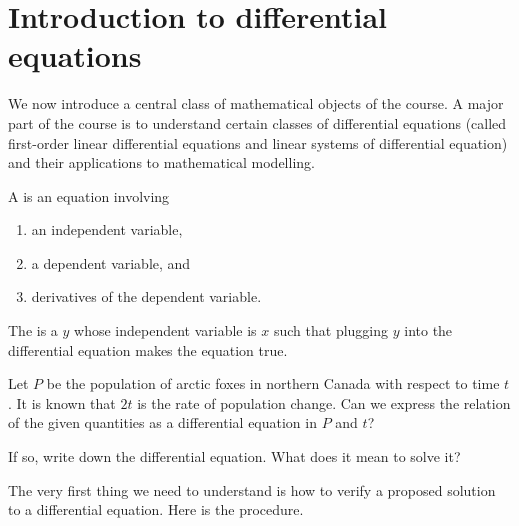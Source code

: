 \documentclass[../main.tex]{subfiles}
\begin{document}
 \section{Introduction to differential equations}

We now introduce a central class of mathematical objects of the course. A major part of the course is to understand certain classes of differential equations (called first-order linear differential equations and linear systems of differential equation) and their applications to mathematical modelling.

\begin{mdframed}[style=simple-compact]
  A  is an equation involving 
  \begin{enumerate}
    \item an independent variable, 
    \item a dependent variable, and
    \item derivatives of the dependent variable.
  \end{enumerate}

  The  is a  \(y\) whose independent variable is \(x\) such that plugging \(y\) into the differential equation makes the equation true.
\end{mdframed}

\begin{example}
  Let \(P\) be the population of arctic foxes in northern Canada with respect to time \(t\). It is known that \(2t\) is the rate of population change. Can we express the relation of the given quantities as a differential equation in \(P\) and \(t\)?

  If so, write down the differential equation. What does it mean to solve it?
\end{example}


The very first thing we need to understand is how to verify a proposed solution to a differential equation.  Here is the procedure.
\end{document}
